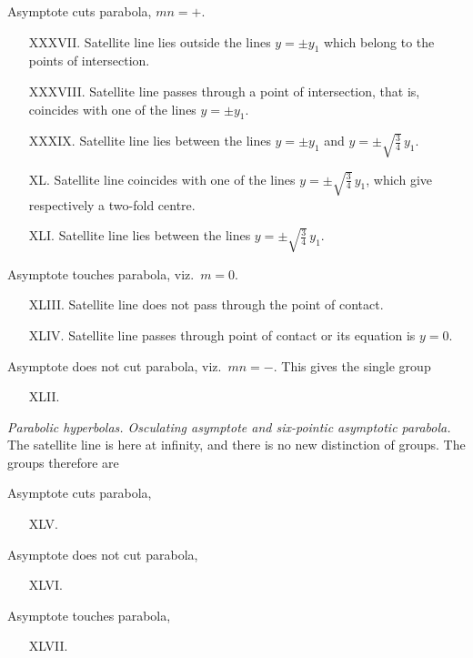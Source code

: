 \documentclass[11pt]{article}
\begin{document}
Asymptote cuts parabola, $m n = +$.
\begin{itemize}\itemsep0pt
\item[XXXVII.] Satellite line lies outside the lines $y = \pm y_{1}$ which belong to the points of intersection.
\item[XXXVIII.] Satellite line passes through a point of intersection, that is, coincides with one of the lines $y = \pm y_{1}$.
\item[XXXIX.] Satellite line lies between the lines $y = \pm y_{1}$ and $y = \pm\sqrt{\tfrac{3}{4}}\, y_{1}$.
\item[XL.] Satellite line coincides with one of the lines $y = \pm\sqrt{\tfrac{3}{4}}\, y_{1}$, which give respectively a two-fold centre.
\item[XLI.] Satellite line lies between the lines $y = \pm\sqrt{\tfrac{3}{4}}\, y_{1}$.
\end{itemize}

Asymptote touches parabola, viz.\ $m = 0$.
\begin{itemize}\itemsep0pt
\item[XLIII.] Satellite line does not pass through the point of contact.
\item[XLIV.] Satellite line passes through point of contact or its equation is $y = 0$.
\end{itemize}

Asymptote does not cut parabola, viz.\ $m n = -$. This gives the single group
\begin{itemize}\itemsep0pt
\item[XLII.]
\end{itemize}

\noindent\emph{Parabolic hyperbolas. Osculating asymptote and six-pointic asymptotic parabola.}
The satellite line is here at infinity, and there is no new distinction of groups. The groups therefore are
\smallskip

Asymptote cuts parabola,
\begin{itemize}\itemsep0pt
\item[XLV.]
\end{itemize}

Asymptote does not cut parabola,
\begin{itemize}\itemsep0pt
\item[XLVI.]
\end{itemize}

Asymptote touches parabola,
\begin{itemize}\itemsep0pt
\item[XLVII.]
\end{itemize}
\end{document}
